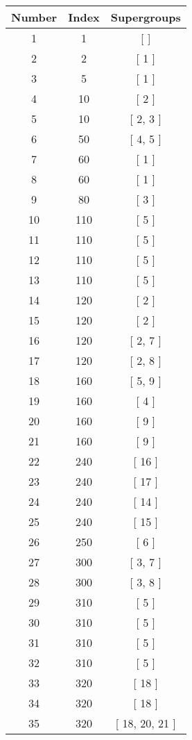 \begin{center}
\begin{longtable}[H]{|| c c c ||}
\hline
Number & Index & Supergroups \\ 
\hline
1 & 1 & [  ] \\ 
\hline
2 & 2 & [ 1 ] \\ 
\hline
3 & 5 & [ 1 ] \\ 
\hline
4 & 10 & [ 2 ] \\ 
\hline
5 & 10 & [ 2, 3 ] \\ 
\hline
6 & 50 & [ 4, 5 ] \\ 
\hline
7 & 60 & [ 1 ] \\ 
\hline
8 & 60 & [ 1 ] \\ 
\hline
9 & 80 & [ 3 ] \\ 
\hline
10 & 110 & [ 5 ] \\ 
\hline
11 & 110 & [ 5 ] \\ 
\hline
12 & 110 & [ 5 ] \\ 
\hline
13 & 110 & [ 5 ] \\ 
\hline
14 & 120 & [ 2 ] \\ 
\hline
15 & 120 & [ 2 ] \\ 
\hline
16 & 120 & [ 2, 7 ] \\ 
\hline
17 & 120 & [ 2, 8 ] \\ 
\hline
18 & 160 & [ 5, 9 ] \\ 
\hline
19 & 160 & [ 4 ] \\ 
\hline
20 & 160 & [ 9 ] \\ 
\hline
21 & 160 & [ 9 ] \\ 
\hline
22 & 240 & [ 16 ] \\ 
\hline
23 & 240 & [ 17 ] \\ 
\hline
24 & 240 & [ 14 ] \\ 
\hline
25 & 240 & [ 15 ] \\ 
\hline
26 & 250 & [ 6 ] \\ 
\hline
27 & 300 & [ 3, 7 ] \\ 
\hline
28 & 300 & [ 3, 8 ] \\ 
\hline
29 & 310 & [ 5 ] \\ 
\hline
30 & 310 & [ 5 ] \\ 
\hline
31 & 310 & [ 5 ] \\ 
\hline
32 & 310 & [ 5 ] \\ 
\hline
33 & 320 & [ 18 ] \\ 
\hline
34 & 320 & [ 18 ] \\ 
\hline
35 & 320 & [ 18, 20, 21 ] \\ 

\end{longtable}
\end{center}
